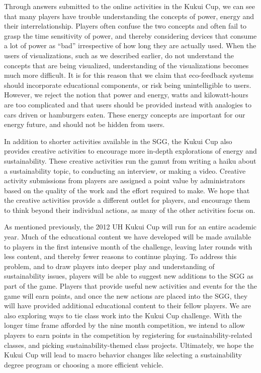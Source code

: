 \documentclass{sigchi}
\begin{document}
Through answers submitted to the online activities in the Kukui Cup, we can see that many players have trouble understanding the concepts of power, energy and their interrelationship. Players often confuse the two concepts and often fail to grasp the time sensitivity of power, and thereby considering devices that consume a lot of power as ``bad'' irrespective of how long they are actually used. When the users of visualizations, such as we described earlier, do not understand the concepts that are being visualized, understanding of the visualizations becomes much more difficult. It is for this reason that we claim that eco-feedback systems should incorporate educational components, or risk being unintelligible to users. However, we reject the notion that power and energy, watts and kilowatt-hours are too complicated and that users should be provided instead with analogies to cars driven or hamburgers eaten. These energy concepts are important for our energy future, and should not be hidden from users.


In addition to shorter activities available in the SGG, the Kukui Cup also provides creative activities to encourage more in-depth explorations of energy and sustainability. These creative activities run the gamut from writing a haiku about a sustainability topic, to conducting an interview, or making a video. Creative activity submissions from players are assigned a point value by administrators based on the quality of the work and the effort required to make. We hope that the creative activities provide a different outlet for players, and encourage them to think beyond their individual actions, as many of the other activities focus on.

As mentioned previously, the 2012 UH Kukui Cup will run for an entire academic year. Much of the educational content we have developed will be made available to players in the first intensive month of the challenge, leaving later rounds with less content, and thereby fewer reasons to continue playing. To address this problem, and to draw players into deeper play and understanding of sustainability issues, players will be able to suggest new additions to the SGG as part of the game. Players that provide useful new activities and events for the the game will earn points, and once the new actions are placed into the SGG, they will have provided additional educational content to their fellow players. We are also exploring ways to tie class work into the Kukui Cup challenge. With the longer time frame afforded by the nine month competition, we intend to allow players to earn points in the competition by registering for sustainability-related classes, and picking sustainability-themed class projects. Ultimately, we hope the Kukui Cup will lead to macro behavior changes like selecting a sustainability degree program or choosing a more efficient vehicle.
\end{document}
